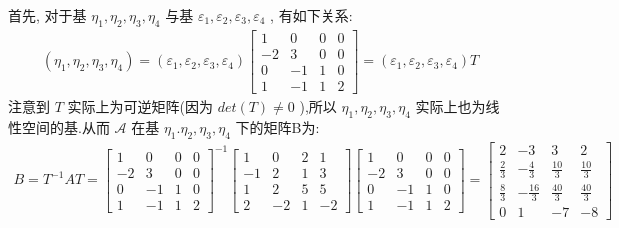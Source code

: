 \documentclass[11pt,a4paper,openany,oneside]{book}
\begin{document}
首先, 对于基 $ \eta_1, \eta_2, \eta_3, \eta_4 $ 与基 $ \varepsilon_1, \varepsilon_2, \varepsilon_3, \varepsilon_4 $ , 有如下关系:
\begin{gather*}
(\eta_1, \eta_2, \eta_3, \eta_4) = (\varepsilon_1, \varepsilon_2, \varepsilon_3, \varepsilon_4)
\begin{bmatrix}
1  &  0  &  0  &  0 \\
-2  &  3  &  0  &  0  \\
0  &  -1  &  1  &  0  \\
1  &  -1  &  1  &  2
\end{bmatrix}=(\varepsilon_1, \varepsilon_2, \varepsilon_3, \varepsilon_4)T
\end{gather*}
注意到 $ T $ 实际上为可逆矩阵(因为 $ det(T) \neq 0 $ ),所以 $ \eta_1, \eta_2, \eta_3, \eta_4 $ 实际上也为线性空间的基.从而 $ \mathcal{A} $ 在基 $ \eta_1. \eta_2, \eta_3, \eta_4 $ 下的矩阵B为:
\begin{gather*}
B = T^{-1}AT =
\begin{bmatrix}
1  &  0  &  0  &  0 \\
-2  &  3  &  0  &  0  \\
0  &  -1  &  1  &  0  \\
1  &  -1  &  1  &  2
\end{bmatrix}^{-1}
\begin{bmatrix}
1  &  0  &  2  &  1  \\
-1  &  2  &  1  &  3  \\
1  &  2  &  5  &  5  \\
2  &  -2  &  1  &  -2
\end{bmatrix}
\begin{bmatrix}
1  &  0  &  0  &  0 \\
-2  &  3  &  0  &  0  \\
0  &  -1  &  1  &  0  \\
1  &  -1  &  1  &  2
\end{bmatrix} =
\begin{bmatrix}
2  &  -3  &  3  &  2  \\
\frac{2}{3}  &  -\frac{4}{3}  &  \frac{10}{3}  &  \frac{10}{3} \\
\frac{8}{3}  &  -\frac{16}{3} &  \frac{40}{3}  &  \frac{40}{3}  \\
0  &  1  &  -7  &  -8
\end{bmatrix}
\end{gather*}  \\  \\  \\
\end{document}
